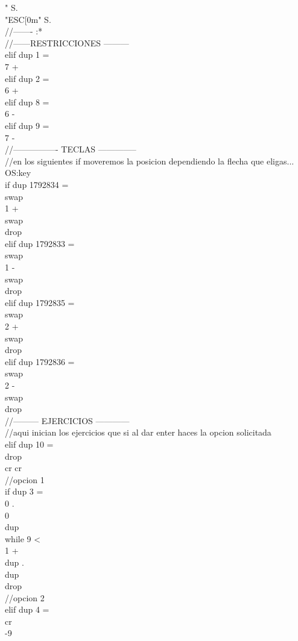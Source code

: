 \documentclass[conference]{IEEEtran}
\begin{document}
\begin{enumerate}
\begin{center}
" S. \\ "ESC[0m" S. \\ //------- :* \\ //------RESTRICCIONES --------- \\ elif dup 1 = \\ 7 + \\ elif dup 2 = \\ 6 + \\ elif dup 8 = \\ 6 - \\ elif dup 9 = \\ 7 - \\ //---------------- TECLAS -------------- \\ //en los siguientes if moveremos la posicion dependiendo la flecha que eligas... \\ OS:key \\ if dup 1792834 = \\ swap \\ 1 + \\ swap \\ drop \\ elif dup 1792833 = \\ swap \\ 1 - \\ swap \\ drop \\ elif dup 1792835 = \\ swap \\ 2 + \\ swap \\ drop \\ elif dup 1792836 = \\ swap \\ 2 - \\ swap \\ drop \\  //--------- EJERCICIOS ------------ \\ //aqui inician los ejercicios que si al dar enter haces la opcion solicitada \\ elif dup 10 = \\ drop \\ cr cr \\ //opcion 1 \\ if dup 3 = \\ 0 . \\ 0 \\ dup \\ while 9 < \\  1 + \\ dup . \\ dup \\ drop \\ //opcion 2 \\ elif dup 4 = \\ cr \\ -9 \\ 
\end{center}
\end{enumerate}
\end{document}
